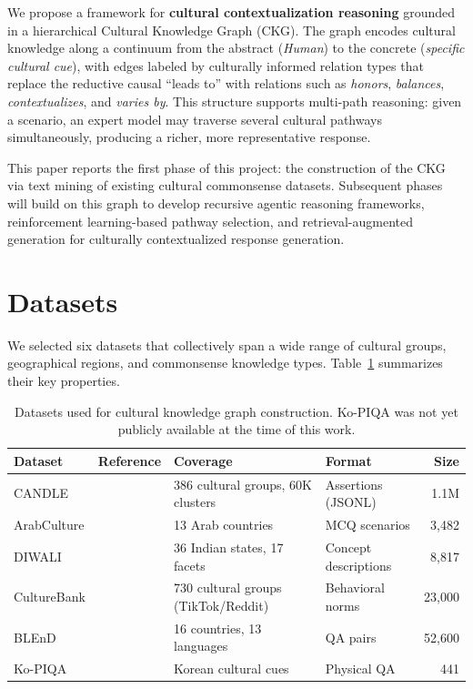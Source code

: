 \documentclass[11pt]{article}
\begin{document}
We propose a framework for \textbf{cultural contextualization reasoning}
grounded in a hierarchical Cultural Knowledge Graph (CKG).
The graph encodes cultural knowledge along a continuum from the abstract
(\emph{Human}) to the concrete (\emph{specific cultural cue}), with
edges labeled by culturally informed relation types that replace the
reductive causal ``leads to'' with relations such as \emph{honors},
\emph{balances}, \emph{contextualizes}, and \emph{varies by}.
This structure supports multi-path reasoning: given a scenario, an expert
model may traverse several cultural pathways simultaneously, producing a
richer, more representative response.

This paper reports the first phase of this project: the construction of
the CKG via text mining of existing cultural commonsense datasets.
Subsequent phases will build on this graph to develop recursive agentic
reasoning frameworks, reinforcement learning-based pathway selection, and
retrieval-augmented generation for culturally contextualized response
generation.

\section{Datasets}
\label{sec:datasets}

We selected six datasets that collectively span a wide range of cultural
groups, geographical regions, and commonsense knowledge types.
Table~\ref{tab:datasets} summarizes their key properties.

\begin{table}[t]
\centering
\small
\begin{tabular}{llllr}
\toprule
\textbf{Dataset} & \textbf{Reference} & \textbf{Coverage} & \textbf{Format} & \textbf{Size} \\
\midrule
CANDLE    & \citet{nguyen2023candle}   & 386 cultural groups, 60K clusters & Assertions (JSONL) & 1.1M \\
ArabCulture & \citet{sadallah2025arab} & 13 Arab countries                 & MCQ scenarios      & 3,482 \\
DIWALI    & \citet{sahoo2025diwali}    & 36 Indian states, 17 facets       & Concept descriptions & 8,817 \\
CultureBank & \citet{shi2024culturebank} & 730 cultural groups (TikTok/Reddit) & Behavioral norms & 23,000 \\
BLEnD     & \citet{myung2024blend}     & 16 countries, 13 languages        & QA pairs           & 52,600 \\
Ko-PIQA   & \citet{choi2025kopiqa}     & Korean cultural cues              & Physical QA        & 441 \\
\bottomrule
\end{tabular}
\caption{Datasets used for cultural knowledge graph construction.
Ko-PIQA was not yet publicly available at the time of this work.}
\label{tab:datasets}
\end{table}
\end{document}
